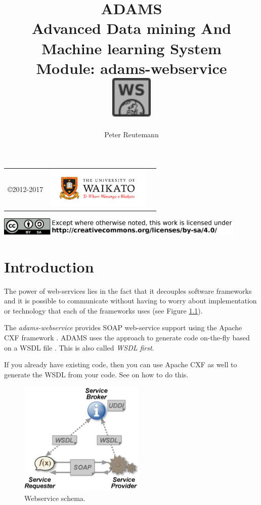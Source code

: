 \documentclass[a4paper]{book}
\title{
  \textbf{ADAMS} \\
  {\Large \textbf{A}dvanced \textbf{D}ata mining \textbf{A}nd \textbf{M}achine
  learning \textbf{S}ystem} \\
  {\Large Module: adams-webservice} \\
  \vspace{1cm}
  \includegraphics[width=2cm]{images/webservice-module.png} \\
}
\author{
  Peter Reutemann
}
\begin{document}
\begin{titlepage}
\maketitle

\thispagestyle{empty}
\center
\begin{table}[b]
	\begin{tabular}{c l l}
		\parbox[c][2cm]{2cm}{\copyright 2012-2017} &
		\parbox[c][2cm]{5cm}{\includegraphics[width=5cm]{images/coat_of_arms.pdf}} \\
	\end{tabular}
	\includegraphics[width=12cm]{images/cc.png} \\
\end{table}

\end{titlepage}

\tableofcontents
\listoffigures

\chapter{Introduction}
The power of web-services \cite{webservice} lies in the fact that it decouples
software frameworks and it is possible to communicate without having to worry
about implementation or technology that each of the frameworks uses (see 
Figure \ref{webservices}). 

The \textit{adams-webservice} provides SOAP \cite{soap} web-service support using the Apache CXF
framework \cite{cxf}. ADAMS uses the approach to generate code on-the-fly based on a 
WSDL file \cite{wsdl}. This is also called \textit{WSDL first}.

If you already have existing code, then you can use Apache CXF as well to 
generate the WSDL from your code. See \cite{cxf-contract-first} on how to do
this.

\begin{figure}[htb]
  \centering
  \includegraphics[width=6.0cm]{images/webservices.png}
  \caption{Webservice schema.}
  \label{webservices}
\end{figure}
\end{document}
